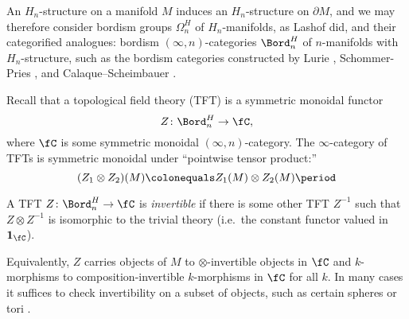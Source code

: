 An $H_n$-structure on a manifold $M$ induces an $H_n$-structure on $\partial M$, and we may therefore consider
bordism groups $\Omega_n^{H}$ of $H_n$-manifolds, as Lashof \cite{Las63} did, and their categorified analogues:
bordism $(\infty, n)$-categories $\Bord_n^H$ of $n$-manifolds with $H_n$-structure, such as the bordism categories
constructed by Lurie \cite{Lur09}, Schommer-Pries \cite{SP17}, and Calaque--Scheimbauer \cite{CS19}.

Recall that a topological field theory (TFT) is a symmetric monoidal functor
\begin{equation}
	Z\colon\Bord_n^H\to\fC,
\end{equation}
where $\fC$ is some symmetric monoidal $(\infty, n)$-category. The $\infty$-category of TFTs is symmetric monoidal
under ``pointwise tensor product:''
\[(Z_1\otimes Z_2)(M) \colonequals Z_1(M)\otimes Z_2(M)\period\]

\begin{defn}
A TFT $Z\colon\Bord_n^H\to\fC$ is \textit{invertible} if there is some other TFT $Z^{-1}$ such that $Z\otimes
Z^{-1}$ is isomorphic to the trivial theory (i.e.\ the constant functor valued in $\mathbf{1}_\fC$).
\end{defn}

\noindent Equivalently, $Z$ carries objects of $M$ to $\otimes$-invertible objects in $\fC$ and $k$-morphisms to
composition-invertible $k$-morphisms in $\fC$ for all $k$. In many cases it suffices to check invertibility on a
subset of objects, such as certain spheres \cite{432876} or tori \cite{SP18}.

